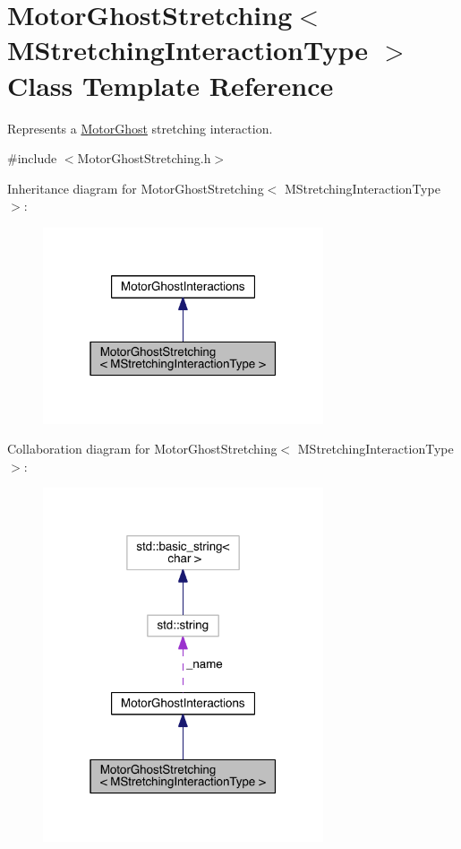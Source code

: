 \hypertarget{classMotorGhostStretching}{\section{Motor\+Ghost\+Stretching$<$ M\+Stretching\+Interaction\+Type $>$ Class Template Reference}
\label{classMotorGhostStretching}
}


Represents a \hyperlink{classMotorGhost}{Motor\+Ghost} stretching interaction.  




{\ttfamily \#include $<$Motor\+Ghost\+Stretching.\+h$>$}



Inheritance diagram for Motor\+Ghost\+Stretching$<$ M\+Stretching\+Interaction\+Type $>$\+:
\nopagebreak
\begin{figure}[H]
\begin{center}
\leavevmode
\includegraphics[width=235pt]{classMotorGhostStretching__inherit__graph}
\end{center}
\end{figure}


Collaboration diagram for Motor\+Ghost\+Stretching$<$ M\+Stretching\+Interaction\+Type $>$\+:
\nopagebreak
\begin{figure}[H]
\begin{center}
\leavevmode
\includegraphics[width=235pt]{classMotorGhostStretching__coll__graph}
\end{center}
\end{figure}
